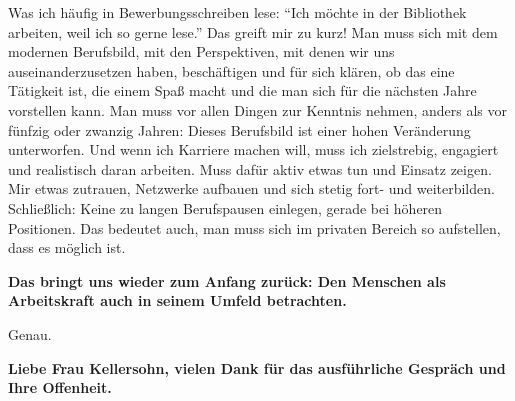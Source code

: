 \documentclass[a4paper,
fontsize=11pt,
oneside,
numbers=noperiodatend,
parskip=half-,
bibliography=totoc,
final
]{scrartcl}
\begin{document}
Was ich häufig in Bewerbungsschreiben lese: \enquote{Ich möchte in der
Bibliothek arbeiten, weil ich so gerne lese.} Das greift mir zu kurz!
Man muss sich mit dem modernen Berufsbild, mit den Perspektiven, mit
denen wir uns auseinanderzusetzen haben, beschäftigen und für sich
klären, ob das eine Tätigkeit ist, die einem Spaß macht und die man sich
für die nächsten Jahre vorstellen kann. Man muss vor allen Dingen zur
Kenntnis nehmen, anders als vor fünfzig oder zwanzig Jahren: Dieses
Berufsbild ist einer hohen Veränderung unterworfen. Und wenn ich
Karriere machen will, muss ich zielstrebig, engagiert und realistisch
daran arbeiten. Muss dafür aktiv etwas tun und Einsatz zeigen. Mir etwas
zutrauen, Netzwerke aufbauen und sich stetig fort- und weiterbilden.
Schließlich: Keine zu langen Berufspausen einlegen, gerade bei höheren
Positionen. Das bedeutet auch, man muss sich im privaten Bereich so
aufstellen, dass es möglich ist.

\newpage 

\textbf{Das bringt uns wieder zum Anfang zurück: Den Menschen als
Arbeitskraft auch in seinem Umfeld betrachten.}

Genau.

\textbf{Liebe Frau Kellersohn, vielen Dank für das ausführliche Gespräch
und Ihre Offenheit.}

\end{document}
